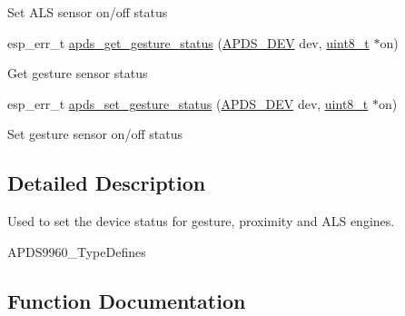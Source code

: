 \begin{DoxyCompactItemize}
\begin{DoxyCompactList}\small\item\em 
\begin{DoxyItemize}
\item Set A\+LS sensor on/off status 
\end{DoxyItemize}\end{DoxyCompactList}\item 
esp\+\_\+err\+\_\+t \hyperlink{group__APDS9960__SetStatusFunctions_ga4297b2f4e2b7dcb1f2bbc6c98833ecc2}{apds\+\_\+get\+\_\+gesture\+\_\+status} (\hyperlink{structAPDS9960__Driver}{A\+P\+D\+S\+\_\+\+D\+EV} dev, \hyperlink{vl53l0x__types_8h_aba7bc1797add20fe3efdf37ced1182c5}{uint8\+\_\+t} $\ast$on)
\begin{DoxyCompactList}\small\item\em 
\begin{DoxyItemize}
\item Get gesture sensor status 
\end{DoxyItemize}\end{DoxyCompactList}\item 
esp\+\_\+err\+\_\+t \hyperlink{group__APDS9960__SetStatusFunctions_gaf9c424c2754e4b96894e73de810500a0}{apds\+\_\+set\+\_\+gesture\+\_\+status} (\hyperlink{structAPDS9960__Driver}{A\+P\+D\+S\+\_\+\+D\+EV} dev, \hyperlink{vl53l0x__types_8h_aba7bc1797add20fe3efdf37ced1182c5}{uint8\+\_\+t} $\ast$on)
\begin{DoxyCompactList}\small\item\em 
\begin{DoxyItemize}
\item Set gesture sensor on/off status 
\end{DoxyItemize}\end{DoxyCompactList}\end{DoxyCompactItemize}


\subsection{Detailed Description}
Used to set the device status for gesture, proximity and A\+LS engines. 

A\+P\+D\+S9960\+\_\+\+Type\+Defines 

\subsection{Function Documentation}
\mbox{\label{group__APDS9960__SetStatusFunctions_gaba6484a7d8a5a7a450cc8c219f797935}} 
